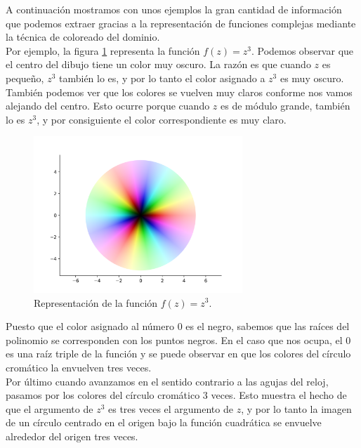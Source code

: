 A continuación mostramos con unos ejemplos la gran cantidad de información que podemos extraer gracias a la representación de funciones complejas mediante la técnica de coloreado del dominio. \\

Por ejemplo, la figura \ref{fig:z^3} representa la función $f(z) = z^3$. Podemos observar que el centro del dibujo tiene un color muy oscuro. La razón es que cuando $z$ es pequeño, $z^3$ también lo es, y por lo tanto el color asignado a $z^3$ es muy oscuro. También podemos ver que los colores se vuelven muy claros conforme nos vamos alejando del centro. Esto ocurre porque cuando $z$ es de módulo grande, también lo es $z^3$, y por consiguiente el color correspondiente es muy claro. \\

\begin{figure}[!htbp]
    \centering
    \includegraphics[width=0.7\textwidth]{../Aplicacion/z^3.png}
    \caption{Representación de la función $f(z) = z^3$.}
    \label{fig:z^3}
\end{figure}

Puesto que el color asignado al número $0$ es el negro, sabemos que las raíces del polinomio se corresponden con los puntos negros. En el caso que nos ocupa, el $0$ es una raíz triple de la función y se puede observar en que los colores del círculo cromático la envuelven tres veces. \\

Por último cuando avanzamos en el sentido contrario a las agujas del reloj, pasamos por los colores del círculo cromático $3$ veces. Esto muestra el hecho de que el argumento de $z^3$ es tres veces el argumento de $z$, y por lo tanto la imagen de un círculo centrado en el origen bajo la función cuadrática se envuelve alrededor del origen tres veces. \\

